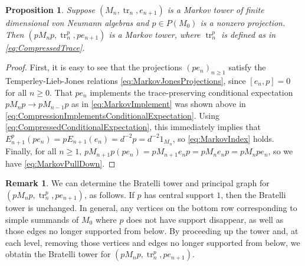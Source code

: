 \documentclass[11pt]{article}
\theoremstyle{plain}
\newtheorem{prop}[thm]{Proposition}
\theoremstyle{definition}
\newtheorem{remark}[thm]{Remark}
\DeclareMathOperator{\tr}{tr}
\begin{document}
\begin{prop}
Suppose $(M_n,\tr_n, e_{n+1})$ is a Markov tower of finite dimensional von Neumann algebras and $p\in P(M_0)$ is a nonzero projection.
Then $(pM_np, \tr_n^p, pe_{n+1})$ is a Markov tower, where $\tr_n^p$ is defined as in \eqref{eq:CompressedTrace}.
\end{prop}
\begin{proof}
First, it is easy to see that the projections $(pe_n)_{n\geq 1}$ satisfy the Temperley-Lieb-Jones relations \ref{eq:MarkovJonesProjections}, since $[e_n,p]=0$ for all $n\geq 0$.
That $pe_n$ implements the trace-preserving conditional expectation $pM_np \to pM_{n-1}p$ as in \ref{eq:MarkovImplement} was shown above in \eqref{eq:CompressionImplementsConditionalExpectation}.
Using \eqref{eq:CompressedConditionalExpectation}, this immediately implies that $E_{n+1}^p(pe_n) = pE_{n+1}(e_n) = d^{-2}p = d^{-2} 1_{M_n}$, so \ref{eq:MarkovIndex} holds.
Finally, for all $n\geq 1$, $pM_{n+1}p (pe_n) = pM_{n+1}e_np = pM_ne_np = pM_npe_n$, so we have \ref{eq:MarkovPullDown}.
\end{proof}

\begin{remark}
We can determine the Bratelli tower and principal graph for $(pM_np, \tr_n^p, pe_{n+1})$, as follows. If $p$ has central support $1$, then the Bratelli tower is unchanged. In general, any vertices on the bottom row corresponding to simple summands of $M_0$ where $p$ does not have support disappear, as well as those edges no longer supported from below. By proceeding up the tower and, at each level, removing those vertices and edges no longer supported from below, we obtatin the Bratelli tower for $(pM_np, \tr_n^p, pe_{n+1})$.
\end{remark}
\end{document}
